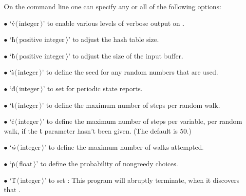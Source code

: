 On the command line one can specify any or all of the following options:
\smallskip
\item{$\bullet$}
`\.v$\langle\,$integer$\,\rangle$' to enable various levels of verbose
output on .
\item{$\bullet$}
`\.h$\langle\,$positive integer$\,\rangle$' to adjust the hash table size.
\item{$\bullet$}
`\.b$\langle\,$positive integer$\,\rangle$' to adjust the size of the input
buffer.
\item{$\bullet$}
`\.s$\langle\,$integer$\,\rangle$' to define the seed for any random numbers
that are used.
\item{$\bullet$}
`\.d$\langle\,$integer$\,\rangle$' to set  for periodic state
reports.
\item{$\bullet$}
`\.t$\langle\,$integer$\,\rangle$' to define the maximum number of steps per
random walk.
\item{$\bullet$}
`\.c$\langle\,$integer$\,\rangle$' to define the maximum number of steps per
variable, per random walk, if the \.t parameter hasn't been given.
(The default is 50.)
\item{$\bullet$}
`\.w$\langle\,$integer$\,\rangle$' to define the maximum number of walks
attempted.
\item{$\bullet$}
`\.p$\langle\,$float$\,\rangle$' to define the probability  of
nongreedy choices.
\item{$\bullet$}
`\.T$\langle\,$integer$\,\rangle$' to set : This program will
abruptly terminate, when it discovers that .

